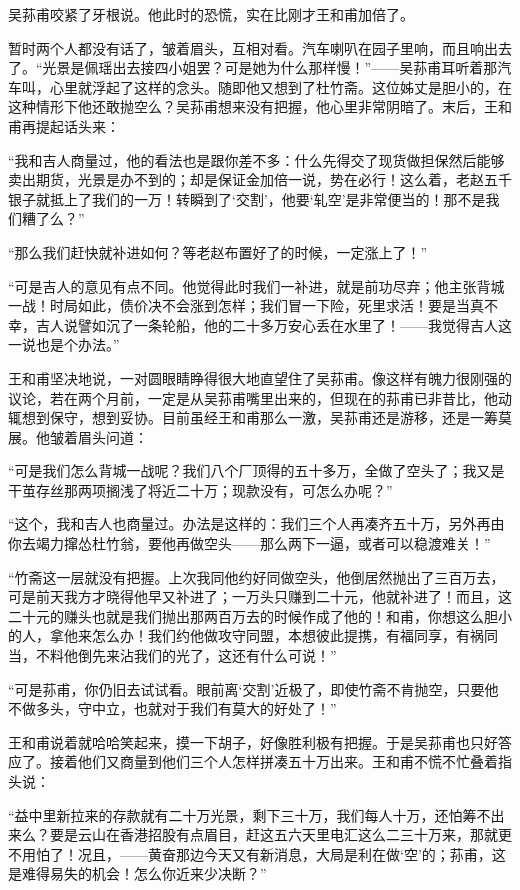 \par 吴荪甫咬紧了牙根说。他此时的恐慌，实在比刚才王和甫加倍了。
\par 暂时两个人都没有话了，皱着眉头，互相对看。汽车喇叭在园子里响，而且响出去了。“光景是佩瑶出去接四小姐罢？可是她为什么那样慢！”——吴荪甫耳听着那汽车叫，心里就浮起了这样的念头。随即他又想到了杜竹斋。这位姊丈是胆小的，在这种情形下他还敢抛空么？吴荪甫想来没有把握，他心里非常阴暗了。末后，王和甫再提起话头来：
\par “我和吉人商量过，他的看法也是跟你差不多：什么先得交了现货做担保然后能够卖出期货，光景是办不到的；却是保证金加倍一说，势在必行！这么着，老赵五千银子就抵上了我们的一万！转瞬到了‘交割’，他要‘轧空’是非常便当的！那不是我们糟了么？”
\par “那么我们赶快就补进如何？等老赵布置好了的时候，一定涨上了！”
\par “可是吉人的意见有点不同。他觉得此时我们一补进，就是前功尽弃；他主张背城一战！时局如此，债价决不会涨到怎样；我们冒一下险，死里求活！要是当真不幸，吉人说譬如沉了一条轮船，他的二十多万安心丢在水里了！——我觉得吉人这一说也是个办法。”
\par 王和甫坚决地说，一对圆眼睛睁得很大地直望住了吴荪甫。像这样有魄力很刚强的议论，若在两个月前，一定是从吴荪甫嘴里出来的，但现在的荪甫已非昔比，他动辄想到保守，想到妥协。目前虽经王和甫那么一激，吴荪甫还是游移，还是一筹莫展。他皱着眉头问道：
\par “可是我们怎么背城一战呢？我们八个厂顶得的五十多万，全做了空头了；我又是干茧存丝那两项搁浅了将近二十万；现款没有，可怎么办呢？”
\par “这个，我和吉人也商量过。办法是这样的：我们三个人再凑齐五十万，另外再由你去竭力撺怂杜竹翁，要他再做空头——那么两下一逼，或者可以稳渡难关！”
\par “竹斋这一层就没有把握。上次我同他约好同做空头，他倒居然抛出了三百万去，可是前天我方才晓得他早又补进了；一万头只赚到二十元，他就补进了！而且，这二十元的赚头也就是我们抛出那两百万去的时候作成了他的！和甫，你想这么胆小的人，拿他来怎么办！我们约他做攻守同盟，本想彼此提携，有福同享，有祸同当，不料他倒先来沾我们的光了，这还有什么可说！”
\par “可是荪甫，你仍旧去试试看。眼前离‘交割’近极了，即使竹斋不肯抛空，只要他不做多头，守中立，也就对于我们有莫大的好处了！”
\par 王和甫说着就哈哈笑起来，摸一下胡子，好像胜利极有把握。于是吴荪甫也只好答应了。接着他们又商量到他们三个人怎样拼凑五十万出来。王和甫不慌不忙叠着指头说：
\par “益中里新拉来的存款就有二十万光景，剩下三十万，我们每人十万，还怕筹不出来么？要是云山在香港招股有点眉目，赶这五六天里电汇这么二三十万来，那就更不用怕了！况且，——黄奋那边今天又有新消息，大局是利在做‘空’的；荪甫，这是难得易失的机会！怎么你近来少决断？”
